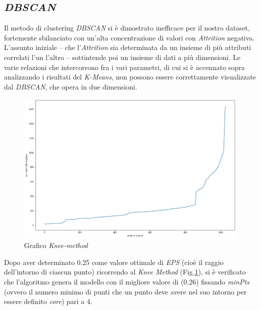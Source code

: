 \subsection{\textit{DBSCAN}}
Il metodo di clustering \textit{DBSCAN} si è dimostrato inefficace per il nostro dataset, fortemente sbilanciato con un’alta concentrazione di valori con \textit{Attrition} negativa. L’assunto iniziale – che l'\textit{Attrition} sia determinata da un insieme di più attributi correlati l’un l’altro – sottintende poi un insieme di dati a più dimensioni. Le varie relazioni che intercorrono fra i vari parametri, di cui si è accennato sopra analizzando i risultati del \textit{K-Means}, non possono essere correttamente visualizzate dal \textit{DBSCAN}, che opera in due dimensioni.
\begin{figure}
    \centering
    \includegraphics[scale = 0.25]{Immagini/dbscanKnee.png}
    \caption{Grafico \textit{Knee-method}}
    \label{fig:KneeDBSCAN}
    \captionsetup{belowskip=0pt}
\end{figure}                                                                                                                                                                                                                                                                    
\noindent Dopo aver determinato 0.25 come valore ottimale di \textit{EPS} (cioè il raggio dell'intorno di ciascun punto) ricorrendo al \textit{Knee Method} (Fig.\ref{fig:KneeDBSCAN}), si è verificato che l’algoritmo genera il modello con il migliore valore di  (0.26) fissando \textit{minPts} (ovvero il numero minimo di punti che un punto deve avere nel suo intorno per essere definito \textit{core}) pari a 4.
